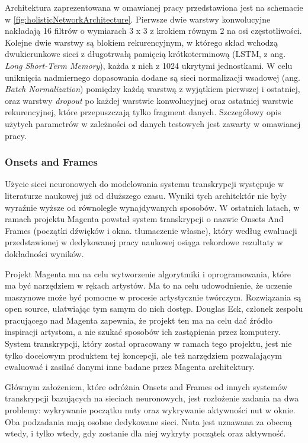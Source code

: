 \documentclass[12pt,a4paper,twoside]{mwart}
\begin{document}
Architektura zaprezentowana w omawianej pracy przedstawiona jest na schemacie w \ref{fig:holisticNetworkArchitecture}. Pierwsze dwie warstwy konwolucyjne nakładają 16 filtrów o wymiarach 3 x 3 z krokiem równym 2 na osi częstotliwości. Kolejne dwie warstwy są blokiem rekurencyjnym, w którego skład wchodzą dwukierunkowe sieci z długotrwałą pamięcią krótkoterminową (LSTM, z ang. \textit{Long Short-Term Memory}), każda z nich z 1024 ukrytymi jednostkami. W celu uniknięcia nadmiernego dopasowania dodane są sieci normalizacji wsadowej (ang. \textit{Batch Normalization}) pomiędzy każdą warstwą z wyjątkiem pierwszej i ostatniej, oraz warstwy \textit{dropout} po każdej warstwie konwolucyjnej oraz ostatniej warstwie rekurencyjnej, które przepuszczają tylko fragment danych. Szczegółowy opis użytych parametrów w zależności od danych testowych jest zawarty w omawianej pracy.



\subsubsection{Onsets and Frames}\label{sec:multif0:onsetsAndFrames}
Użycie sieci neuronowych do modelowania systemu transkrypcji występuje w literaturze naukowej już od dłuższego czasu. Wyniki tych architektór nie były wyraźnie wyższe od równolegle wynajdywanych sposobów. W ostatnich latach, w ramach projektu Magenta \cite{Transcription:Magenta} powstał system transkrypcji o nazwie Onsets And Frames (początki dźwięków i okna. tłumaczenie własne), który według ewaluacji przedstawionej w dedykowanej pracy naukowej \cite{Transcription:Hawthorne:OnsetsAndFrames} osiąga rekordowe rezultaty w dokładności wyników.

Projekt Magenta ma na celu wytworzenie algorytmiki i oprogramowania, które ma być narzędziem w rękach artystów. Ma to na celu udowodnienie, że uczenie maszynowe może być pomocne w procesie artystycznie twórczym.  Rozwiązania są open source, ułatwiając tym samym do nich dostęp. Douglas Eck, członek zespołu pracującego nad Magenta zapewnia, że projekt ten ma na celu dać źródło inspiracji artystom, a nie szukać sposobów ich zastąpienia przez komputery. System transkrypcji, który został opracowany w ramach tego projektu, jest nie tylko docelowym produktem tej koncepcji, ale też narzędziem pozwalającym ewaluować i zasilać danymi inne badane przez Magenta architektury.

Głównym założeniem, które odróżnia Onsets and Frames od innych systemów transkrypcji bazujących na sieciach neuronowych, jest rozłożenie zadania na dwa problemy: wykrywanie początku nuty oraz wykrywanie aktywności nut w oknie. Oba pod\-zadania mają osobne dedykowane sieci. Nuta jest uznawana za obecną wtedy, i tylko wtedy, gdy zostanie dla niej wykryty początek oraz aktywność.
\end{document}
